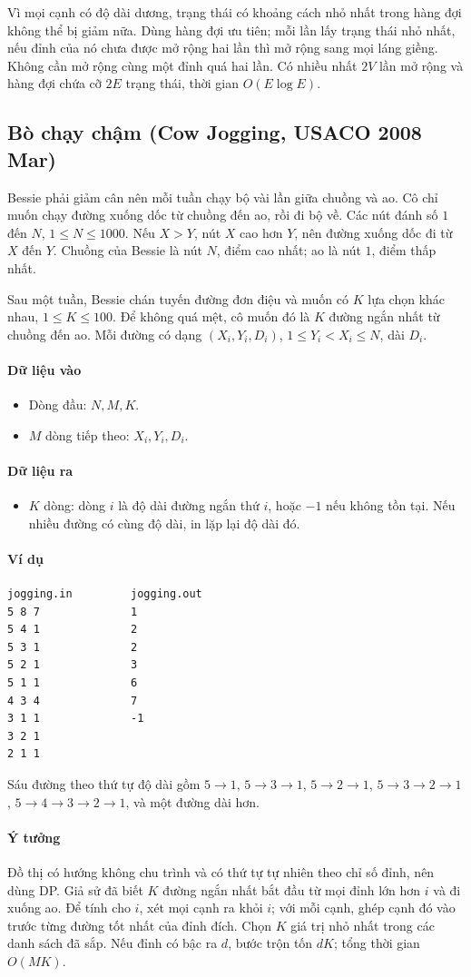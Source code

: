 \documentclass[11pt]{article}
\newcommand{\problem}[1]{\subsection{#1}}
\newcommand{\iosec}[1]{\paragraph{#1}}
\newcommand{\bigO}[1]{\ensuremath{O(#1)}}
\begin{document}
Vì mọi cạnh có độ dài dương, trạng thái có khoảng cách nhỏ nhất trong hàng đợi không thể bị giảm nữa. Dùng hàng đợi ưu tiên; mỗi lần lấy trạng thái nhỏ nhất, nếu đỉnh của nó chưa được mở rộng hai lần thì mở rộng sang mọi láng giềng. Không cần mở rộng cùng một đỉnh quá hai lần. Có nhiều nhất \(2V\) lần mở rộng và hàng đợi chứa cỡ \(2E\) trạng thái, thời gian \(\bigO{E\log E}\).

\problem{Bò chạy chậm (Cow Jogging, USACO 2008 Mar)}

Bessie phải giảm cân nên mỗi tuần chạy bộ vài lần giữa chuồng và ao. Cô chỉ muốn chạy đường xuống dốc từ chuồng đến ao, rồi đi bộ về. Các nút đánh số \(1\) đến \(N\), \(1 \le N \le 1000\). Nếu \(X>Y\), nút \(X\) cao hơn \(Y\), nên đường xuống dốc đi từ \(X\) đến \(Y\). Chuồng của Bessie là nút \(N\), điểm cao nhất; ao là nút \(1\), điểm thấp nhất.

Sau một tuần, Bessie chán tuyến đường đơn điệu và muốn có \(K\) lựa chọn khác nhau, \(1 \le K \le 100\). Để không quá mệt, cô muốn đó là \(K\) đường ngắn nhất từ chuồng đến ao. Mỗi đường có dạng \((X_i,Y_i,D_i)\), \(1 \le Y_i<X_i\le N\), dài \(D_i\).

\iosec{Dữ liệu vào}
\begin{itemize}
  \item Dòng đầu: \(N,M,K\).
  \item \(M\) dòng tiếp theo: \(X_i,Y_i,D_i\).
\end{itemize}

\iosec{Dữ liệu ra}
\begin{itemize}
  \item \(K\) dòng: dòng \(i\) là độ dài đường ngắn thứ \(i\), hoặc \(-1\) nếu không tồn tại. Nếu nhiều đường có cùng độ dài, in lặp lại độ dài đó.
\end{itemize}

\iosec{Ví dụ}
\begin{verbatim}
jogging.in         jogging.out
5 8 7              1
5 4 1              2
5 3 1              2
5 2 1              3
5 1 1              6
4 3 4              7
3 1 1              -1
3 2 1
2 1 1
\end{verbatim}

Sáu đường theo thứ tự độ dài gồm \(5\to1\), \(5\to3\to1\), \(5\to2\to1\), \(5\to3\to2\to1\), \(5\to4\to3\to2\to1\), và một đường dài hơn.

\iosec{Ý tưởng}
Đồ thị có hướng không chu trình và có thứ tự tự nhiên theo chỉ số đỉnh, nên dùng DP. Giả sử đã biết \(K\) đường ngắn nhất bắt đầu từ mọi đỉnh lớn hơn \(i\) và đi xuống ao. Để tính cho \(i\), xét mọi cạnh ra khỏi \(i\); với mỗi cạnh, ghép cạnh đó vào trước từng đường tốt nhất của đỉnh đích. Chọn \(K\) giá trị nhỏ nhất trong các danh sách đã sắp. Nếu đỉnh có bậc ra \(d\), bước trộn tốn \(dK\); tổng thời gian \(\bigO{MK}\).
\end{document}
